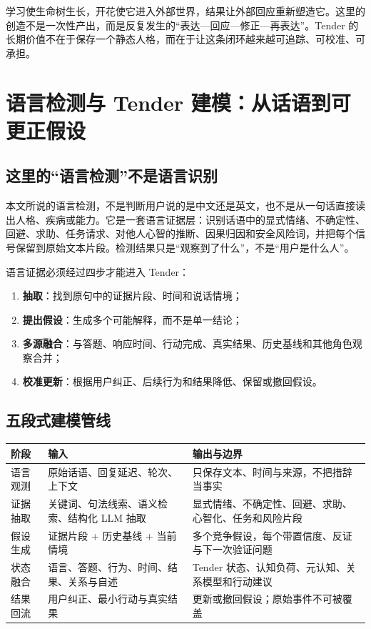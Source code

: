 \documentclass[UTF8,a4paper,11pt]{ctexart}
\begin{document}
学习使生命树生长，开花使它进入外部世界，结果让外部回应重新塑造它。这里的创造不是一次性产出，而是反复发生的“表达—回应—修正—再表达”。Tender 的长期价值不在于保存一个静态人格，而在于让这条闭环越来越可追踪、可校准、可承担。

\newpage
\section{语言检测与 Tender 建模：从话语到可更正假设}

\subsection{这里的“语言检测”不是语言识别}

本文所说的语言检测，不是判断用户说的是中文还是英文，也不是从一句话直接读出人格、疾病或能力。它是一套语言证据层：识别话语中的显式情绪、不确定性、回避、求助、任务请求、对他人心智的推断、因果归因和安全风险词，并把每个信号保留到原始文本片段。检测结果只是“观察到了什么”，不是“用户是什么人”。

语言证据必须经过四步才能进入 Tender：

\begin{enumerate}
\item \textbf{抽取}：找到原句中的证据片段、时间和说话情境；
\item \textbf{提出假设}：生成多个可能解释，而不是单一结论；
\item \textbf{多源融合}：与答题、响应时间、行动完成、真实结果、历史基线和其他角色观察合并；
\item \textbf{校准更新}：根据用户纠正、后续行为和结果降低、保留或撤回假设。
\end{enumerate}

\subsection{五段式建模管线}

\begin{center}
\begin{longtable}{@{}p{2.7cm}p{4.3cm}p{6.1cm}@{}}
\toprule
\textbf{阶段} & \textbf{输入} & \textbf{输出与边界} \\
\midrule
语言观测 & 原始话语、回复延迟、轮次、上下文 & 只保存文本、时间与来源，不把措辞当事实 \\
证据抽取 & 关键词、句法线索、语义检索、结构化 LLM 抽取 & 显式情绪、不确定性、回避、求助、心智化、任务和风险片段 \\
假设生成 & 证据片段 + 历史基线 + 当前情境 & 多个竞争假设，每个带置信度、反证与下一次验证问题 \\
状态融合 & 语言、答题、行为、时间、结果、关系与自述 & Tender 状态、认知负荷、元认知、关系模型和行动建议 \\
结果回流 & 用户纠正、最小行动与真实结果 & 更新或撤回假设；原始事件不可被覆盖 \\
\bottomrule
\end{longtable}
\end{center}
\end{document}
